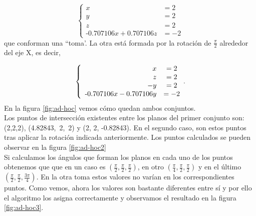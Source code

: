 \[
\left\{
\begin{array}{rcl}
x &= 2\\ 
y &= 2\\
z &= 2\\
\text{-0.707106}x + \text{0.707106}z &= -2
\end{array}
\right.
\]
que conforman una ``toma'. La otra está formada por la rotación de $ \frac{\pi}{2} $ alrededor del eje X, es decir,

\[\\
\left\{
\begin{array}{rcl}
x &= 2\\
z &= 2\\
-y & = 2\\
\text{-0.707106}x - \text{0.707106}y &= -2
\end{array}.
\right. 
\]
En la figura \ref{fig:ad-hoc} vemos cómo quedan ambos conjuntos. \\


Los puntos de intersección existentes entre los planos del primer conjunto son: (2,2,2), \mbox{(4.82843, 2, 2)} y (2, 2, -0.82843). En el segundo caso, son estos puntos tras aplicar la rotación indicada anteriormente. Los puntos calculados se pueden observar en la figura \ref{fig:ad-hoc2}\\


Si calculamos los ángulos que forman los planos en cada uno de los puntos obtenemos que que en un caso es $ (\frac{\pi}{2}, \frac{\pi}{2}, \frac{\pi}{2}) $, en otro $ (\frac{\pi}{4}, \frac{\pi}{2}, \frac{\pi}{2}) $ y en el último $ (\frac{\pi}{2}, \frac{\pi}{2}, \frac{3\pi}{4}) $. En la otra toma estos valores no varían en los correspondientes puntos. Como vemos, ahora los valores son bastante diferentes entre sí y por ello el algoritmo los asigna correctamente y observamos el resultado en la figura \ref{fig:ad-hoc3}. \\

